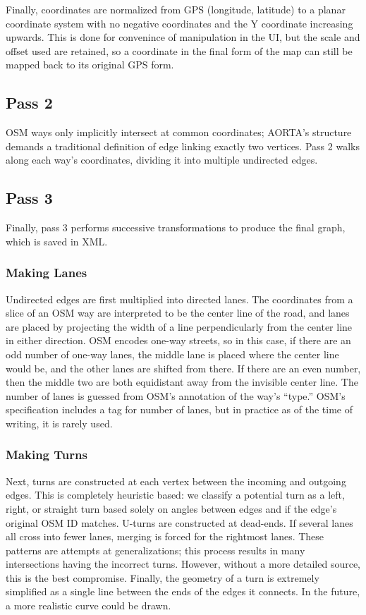 \documentclass[letterpaper, 10 pt, conference]{ieeeconf}  %
\begin{document}
Finally, coordinates are normalized from GPS (longitude, latitude) to a planar
coordinate system with no negative coordinates and the Y coordinate increasing
upwards. This is done for convenince of manipulation in the UI, but the scale
and offset used are retained, so a coordinate in the final form of the map can
still be mapped back to its original GPS form.

\subsection{Pass 2}

OSM ways only implicitly intersect at common coordinates; AORTA's structure
demands a traditional definition of edge linking exactly two vertices. Pass 2
walks along each way's coordinates, dividing it into multiple undirected edges.

\subsection{Pass 3}

Finally, pass 3 performs successive transformations to produce the final graph,
which is saved in XML.

\subsubsection{Making Lanes}

Undirected edges are first multiplied into directed lanes. The coordinates from
a slice of an OSM way are interpreted to be the center line of the road, and
lanes are placed by projecting the width of a line perpendicularly from the
center line in either direction. OSM encodes one-way streets, so in this case,
if there are an odd number of one-way lanes, the middle lane is placed where the
center line would be, and the other lanes are shifted from there. If there are
an even number, then the middle two are both equidistant away from the invisible
center line. The number of lanes is guessed from OSM's annotation of the way's
``type.'' OSM's specification includes a tag for number of lanes, but in
practice as of the time of writing, it is rarely used.

\subsubsection{Making Turns}

Next, turns are constructed at each vertex between the incoming and outgoing
edges. This is completely heuristic based: we classify a potential turn as a
left, right, or straight turn based solely on angles between edges and if the
edge's original OSM ID matches. U-turns are constructed at dead-ends. If several
lanes all cross into fewer lanes, merging is forced for the rightmost lanes.
These patterns are attempts at generalizations; this process results in many
intersections having the incorrect turns. However, without a more detailed
source, this is the best compromise. Finally, the geometry of a turn is
extremely simplified as a single line between the ends of the edges it connects.
In the future, a more realistic curve could be drawn.
\end{document}
